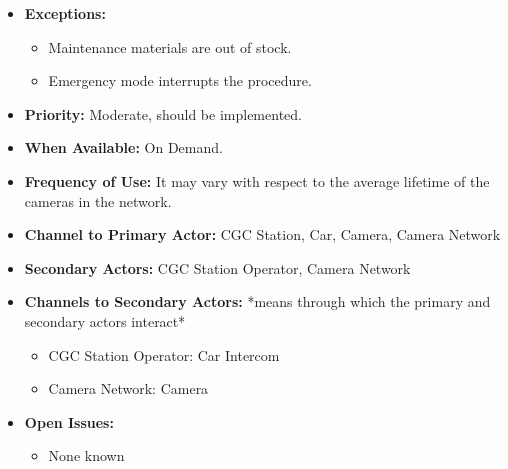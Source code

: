 \documentclass[12pt]{article}
\begin{document}
\begin{itemize}
        \item[]\textbf{Exceptions:}
            \begin{itemize}
                \item[] Maintenance materials are out of stock.
                \item[] Emergency mode interrupts the procedure.
            \end{itemize}

        \item[]\textbf{Priority:}
            Moderate, should be implemented.

        \item[]\textbf{When Available:}
            On Demand.

        \item[]\textbf{Frequency of Use:}
            It may vary with respect to the average lifetime of the cameras in the network.

        \item[]\textbf{Channel to Primary Actor:}
            CGC Station, Car, Camera, Camera Network

        \item[]\textbf{Secondary Actors:}
            CGC Station Operator, Camera Network
            
        \item[]\textbf{Channels to Secondary Actors:}
            *means through which the primary and secondary actors interact*
            \begin{itemize}
                \item[] CGC Station Operator: Car Intercom
                \item[] Camera Network: Camera
            \end{itemize}

        \item[]\textbf{Open Issues:}
            \begin{itemize}
                \item[] None known
            \end{itemize}
    \end{itemize}
%    
%    
%    
    
\end{document}
